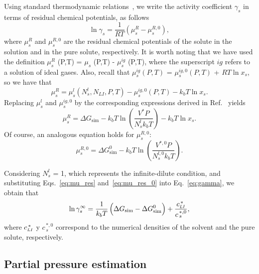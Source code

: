 \documentclass[3p,twocolumn]{elsarticle}
\begin{document}
Using standard thermodynamic relations~\cite{Tester}, we write the activity coefficient $\gamma_s$ in terms of residual chemical potentials, as follows
\begin{equation}
\label{eq:gamma}
\ln \gamma_s = \frac{1}{RT} (\mu_s^R - \mu_s^{R,0}),
\end{equation}
where $\mu_s^R$ and $\mu_s^{R,0}$ are the residual chemical potentials of the solute in the solution and in the pure solute, respectively. It is worth noting that we have used the definition $\mu_s^{R}$ (P,T) = $\mu_s$ (P,T) - $\mu_s^{ig}$ (P,T), where the superscript $ig$ refers to a solution of ideal gases. Also, recall that $\mu_s^{ig} (P,T)$ = $\mu_s^{ig,0} (P,T)$ + $RT \ln x_s$, so we have that
\begin{equation}
\mu_s^R = \mu_s^l(N_s^l,N_{LI},P,T) - \mu_s^{ig,0}(P,T) - k_b T \ln x_s. 
\end{equation}
Replacing $\mu_s^{l}$ and $\mu_s^{ig,0}$ by the corresponding expressions derived in Ref.~\cite{Shirts_2003} yields
\begin{equation}
\label{eq:mu_res}
\mu_s^R = \Delta G_{\text{sim}} - k_b T \ln \left( \frac{V^{\ast} P}{N_s^l k_b T} \right) -  k_b T \ln x_s.
\end{equation}
Of course, an analogous equation holds for $\mu_s^{R,0}$:
\begin{equation}
\label{eq:mu_res_0}
\mu_s^{R,0} = \Delta G_{\text{sim}}^{0} - k_b T \ln \left( \frac{V^{\ast,0} P}{N_s^{l,0} k_b T} \right).
\end{equation}

Considering $N_s^{l}$ = 1, which represents the infinite-dilute condition, and substituting Eqs.~\ref{eq:mu_res} and~\ref{eq:mu_res_0} into Eq.~\ref{eq:gamma}, we  obtain that
\begin{equation}
\label{eq:gamma_inf}
\ln \gamma^{\infty}_s = \frac{1}{k_b T} \left( \Delta G_{\text{sim}} - \Delta G_{\text{sim}}^{0} \right) + \frac{c_{\scaleto{LI}{4pt}}^{\, \ast}}{c_{\, s}^{\, \ast,0}},
\end{equation}
where $c_{\scaleto{LI}{4pt}}^{\, \ast}$ y $c_{\, s}^{\, \ast,0}$ correspond to the numerical densities of the solvent and the pure solute, respectively.

\subsection*{Partial pressure estimation}
\label{sec:partial_pressure}
\end{document}
